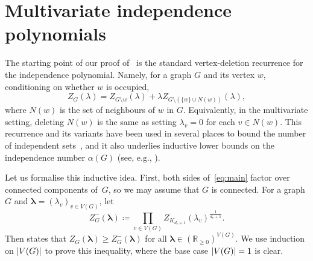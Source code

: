 \documentclass{article}
\numberwithin{equation}{section}
\theoremstyle{plain}
\theoremstyle{definition}
\theoremstyle{remark} %
\DeclarePairedDelimiter{\abs}{\lvert}{\rvert}
\newcommand{\defeq}{\coloneqq}
\newcommand{\RR}{\mathbb{R}}
\newcommand{\blambda}{\bm{\lambda}}
\begin{document}
\section{Multivariate independence polynomials}\label{sec:indep-poly}

The starting point of our proof of~ is the standard vertex-deletion recurrence for the independence polynomial. Namely, for a graph \(G\) and its vertex \(w\), conditioning on whether \(w\) is occupied,
\[
    Z_G(\lambda) = Z_{G\setminus w}(\lambda) + \lambda Z_{G\setminus (\{w\}\cup N(w))}(\lambda),
\]
where \(N(w)\) is the set of neighbours of \(w\) in \(G\). Equivalently, in the multivariate setting, deleting \(N(w)\) is the same as setting \(\lambda_v=0\) for each \(v\in N(w)\).
This recurrence and its variants have been used in several places to bound the number of independent sets~\cite{galvin2011number,sah2019number,sah2020reverse,buys2025triangle}, and it also underlies inductive lower bounds on the independence number \(\alpha(G)\) (see, e.g., \cite{shearer1983note}).

\medskip

Let us formalise this inductive idea. First, both sides of~\eqref{eq:main} factor over connected components of~\(G\), so we may assume that \(G\) is connected.
For a graph \(G\) and \(\blambda=(\lambda_v)_{v\in V(G)}\), let
\[
	Z^-_G(\blambda) \defeq \prod_{v \in V(G)} Z_{K_{d_v+1}}(\lambda_v)^{\frac{1}{d_v+1}}.
\]
Then  states that \(Z_G(\blambda) \ge Z^-_G(\blambda)\) for all \(\blambda\in (\RR_{\ge0})^{V(G)}\).
We use induction on \(\abs{V(G)}\) to prove this inequality, where the base case \(\abs{V(G)}=1\) is clear. 
\end{document}

